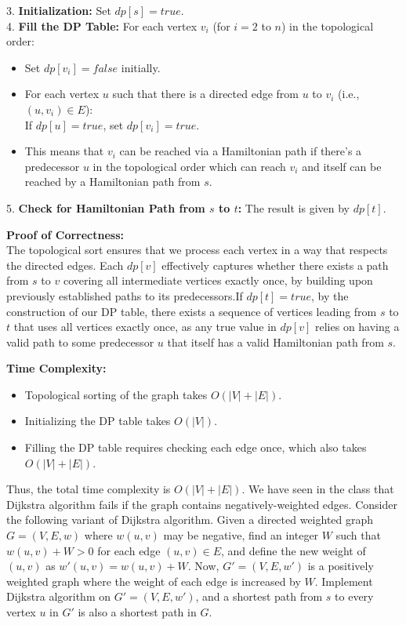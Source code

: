 \documentclass{oxmathproblems}
\begin{document}
\begin{questions}
3. \textbf{Initialization:}
   Set $dp[s] = true$.\\
4. \textbf{Fill the DP Table:}
   For each vertex $v_i$ (for $i = 2$ to $n$) in the topological order:\begin{itemize}
       \item    Set $dp[v_i] = false$ initially.
       \item    For each vertex $u$ such that there is a directed edge from $u$ to $v_i$ (i.e., $(u, v_i) \in E$):\\If $dp[u] = true$, set $dp[v_i] = true$.
       \item    This means that $v_i$ can be reached via a Hamiltonian path if there's a predecessor $u$ in the topological order which can reach $v_i$ and itself can be reached by a Hamiltonian path from $s$.
       \end{itemize}
5. \textbf{Check for Hamiltonian Path from $s$ to $t$:}
   The result is given by $dp[t]$.

\textbf{Proof of Correctness:}\\
The topological sort ensures that we process each vertex in a way that respects the directed edges. Each $dp[v]$ effectively captures whether there exists a path from $s$ to $v$ covering all intermediate vertices exactly once, by building upon previously established paths to its predecessors.If $dp[t] = true$, by the construction of our DP table, there exists a sequence of vertices leading from $s$ to $t$ that uses all vertices exactly once, as any true value in $dp[v]$ relies on having a valid path to some predecessor $u$ that itself has a valid Hamiltonian path from $s$.

\textbf{Time Complexity:}
\begin{itemize}
    \item Topological sorting of the graph takes $O(|V| + |E|)$.
    \item Initializing the DP table takes $O(|V|)$.
    \item Filling the DP table requires checking each edge once, which also takes $O(|V| + |E|)$.
\end{itemize}
Thus, the total time complexity is $O(|V| + |E|)$.
\miquestion[25] 
We have seen in the class that Dijkstra algorithm fails if the graph contains negatively-weighted edges.
Consider the following variant of Dijkstra algorithm.
Given a directed weighted graph $G=(V,E,w)$ where $w(u,v)$ may be negative, find an integer $W$ such that $w(u,v)+W>0$ for each edge $(u,v)\in E$, and define the new weight of $(u,v)$ as $w'(u,v)=w(u,v)+W$.
Now, $G'=(V,E,w')$ is a positively weighted graph where the weight of each edge is increased by $W$.
Implement Dijkstra algorithm on $G'=(V,E,w')$, and a shortest path from $s$ to every vertex $u$ in $G'$ is also a shortest path in $G$.
\begin{parts}

\end{parts}
\end{questions}
\end{document}
